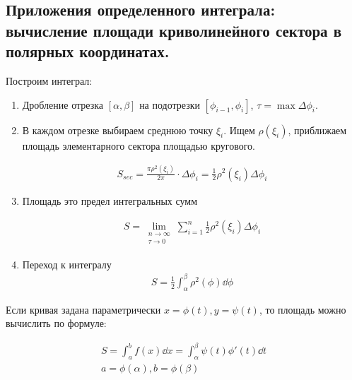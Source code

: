\subsection{%
  Приложения определенного интеграла: вычисление площади криволинейного сектора
  в полярных координатах.%
}

\begin{twocolumns}
  
  \columnbreak

  Построим интеграл:
  \begin{enumerate}
    \item Дробление отрезка \([\alpha, \beta]\) на подотрезки
      \([\phi_{i - 1}, \phi_{i}]\), \(\tau = \max \Delta \phi_{i}\).

    \item В каждом отрезке выбираем среднюю точку \(\xi_{i}\). Ищем
      \(\rho(\xi_{i})\), приближаем площадь элементарного сектора площадью
      кругового.
    
      \begin{align*}
        S_{sec}
        = \frac{\pi \rho^2(\xi_{i})}{2 \pi} \cdot \Delta \phi_{i}
        = \frac{1}{2} \rho^2(\xi_{i}) \Delta \phi_{i}
      \end{align*}

    \item Площадь это предел интегральных сумм
    
    \begin{align*}
      S = \lim_{\substack{n \to \infty \\ \tau \to 0}}
        \sum_{i = 1}^{n} \frac{1}{2} \rho^2(\xi_{i}) \Delta \phi_{i}
    \end{align*}
    
    \item Переход к интегралу
    \begin{align*}
      S = \frac{1}{2} \int_{\alpha}^{\beta} \rho^2(\phi) \dd \phi
    \end{align*}
  \end{enumerate}
\end{twocolumns}

\begin{remark}
  Если кривая задана параметрически \(x = \phi(t), y = \psi(t)\), то площадь
  можно вычислить по формуле:

  \begin{align*}
    S
    = \int_{a}^{b} f(x) \dd x
    = \int_{\alpha}^{\beta} \psi(t) \phi'(t) \dd t \\
    a = \phi(\alpha), b = \phi(\beta)
  \end{align*}
\end{remark}
